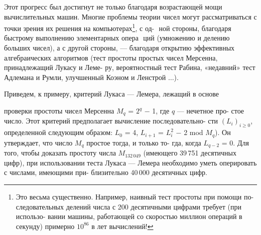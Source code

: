 \vspace{3pt} Этот прогресс был достигнут не только благодаря возрастающей \linebreak
мощи вычислительных машин. Многие проблемы теории чисел могут \linebreak
рассматриваться с точки зрения их решения на компьютерах\footnote{Это весьма существенно. Например, наивный тест простоты при помощи по­- \linebreak
следовательных делений числа с 200 десятичными цифрами требует (при использо­- \linebreak
вании машины, работающей со скоростью миллион операций в секунду) примерно \linebreak
$10^{86}$ в лет вычислений!}, с од- ­\linebreak
ной стороны, благодаря быстрому выполнению элементарных опера ­\linebreak
ций (умножению и делению больших чисел), а с другой стороны, --- \linebreak
благодаря открытию эффективных алгебраических алгоритмов (тест \linebreak
простоты простых чисел Мерсенна, принадлежащий Лукасу и Леме- \linebreak
ру, вероятностный тест Рабина, «недавний» тест Адлемана и Румли, \linebreak
улучшенный Коэном и Ленстрой $\dots$). \ 

\vspace{3pt} Приведем, к примеру, критерий Лукаса --- Лемера, лежащий в основе

\newpage
{}
\normalsize

\noindent проверки простоты чисел Мерсенна $M_q$ = $2^q$ $-$ 1, где $q$ --- нечетное про­- \linebreak
стое число. Этот критерий предполагает вычисление последовательно­- \linebreak
сти $(L_i)_{i \geqslant 0}$, определенной следующим образом: $L_0$ = 4, $L_{i + 1}$ = $L^2_i$ $-$ 2 \linebreak
mod $M_q$). Он утверждает, что число $M_q$ простое тогда, и только то­- \linebreak
гда, когда  $L_{q - 2}$ = 0. Для того, чтобы доказать простоту числа $M_{132\,049}$ \linebreak
(имеющего 39\,751 десятичных цифр), при использовании теста Лукаса \linebreak
--- Лемера необходимо уметь оперировать с числами, имеющими при­- \linebreak
близительно 40\,000 десятичных цифр. \ 

